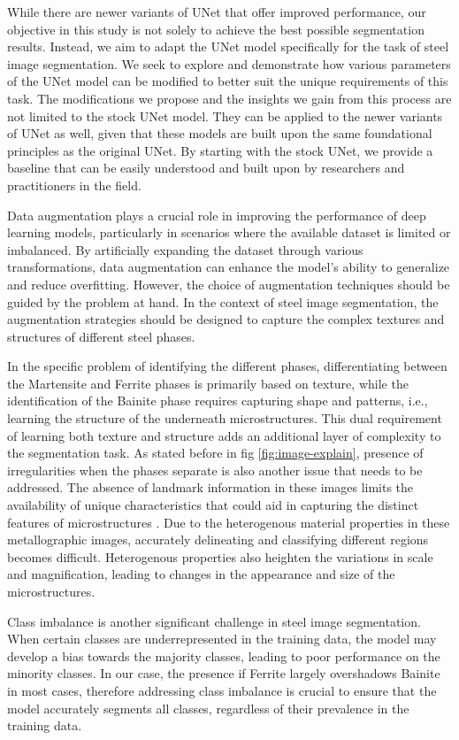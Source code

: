 \documentclass[]{article}
\begin{document}
While there are newer variants of UNet that offer improved performance, our objective in this study is not solely to achieve the best possible segmentation results. Instead, we aim to adapt the UNet model specifically for the task of steel image segmentation. We seek to explore and demonstrate how various parameters of the UNet model can be modified to better suit the unique requirements of this task. The modifications we propose and the insights we gain from this process are not limited to the stock UNet model. They can be applied to the newer variants of UNet as well, given that these models are built upon the same foundational principles as the original UNet. By starting with the stock UNet, we provide a baseline that can be easily understood and built upon by researchers and practitioners in the field.

Data augmentation plays a crucial role in improving the performance of deep learning models, particularly in scenarios where the available dataset is limited or imbalanced. By artificially expanding the dataset through various transformations, data augmentation can enhance the model's ability to generalize and reduce overfitting. However, the choice of augmentation techniques should be guided by the problem at hand. In the context of steel image segmentation, the augmentation strategies should be designed to capture the complex textures and structures of different steel phases.

In the specific problem of identifying the different phases, differentiating between the Martensite and Ferrite phases is primarily based on texture, while the identification of the Bainite phase requires capturing shape and patterns, i.e., learning the structure of the underneath microstructures. This dual requirement of learning both texture and structure adds an additional layer of complexity to the segmentation task. As stated before in fig \ref{fig:image-explain}, presence of irregularities when the phases separate is also another issue that needs to be addressed. The absence of landmark information in these images limits the availability of unique characteristics that could aid in capturing the distinct features of microstructures \cite{LUENGO2022232}. Due to the heterogenous material properties in these metallographic images, accurately delineating and classifying different regions becomes difficult. Heterogenous properties also heighten the variations in scale and magnification, leading to changes in the appearance and size of the microstructures.

Class imbalance is another significant challenge in steel image segmentation. When certain classes are underrepresented in the training data, the model may develop a bias towards the majority classes, leading to poor performance on the minority classes. In our case, the presence if Ferrite largely overshadows Bainite in most cases, therefore addressing class imbalance is crucial to ensure that the model accurately segments all classes, regardless of their prevalence in the training data.
\end{document}
